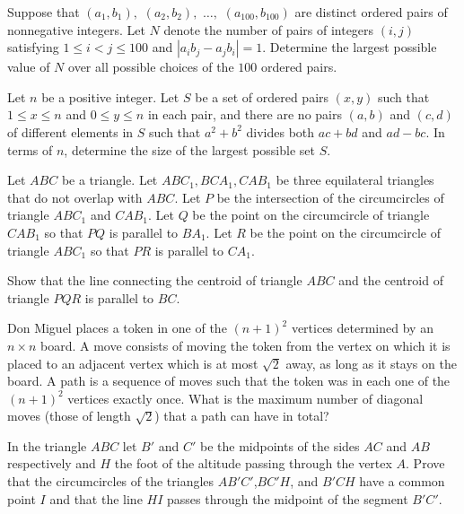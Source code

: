 \documentclass[11pt]{scrartcl}
\begin{document}
\begin{problem}[2556841339462610604]
	Suppose that $(a_1,b_1),$ $(a_2,b_2),$ $\dots,$ $(a_{100},b_{100})$ are distinct ordered pairs of nonnegative integers. Let $N$ denote the number of pairs of integers $(i,j)$ satisfying $1\leq i<j\leq 100$ and $|a_ib_j-a_jb_i|=1$. Determine the largest possible value of $N$ over all possible choices of the $100$ ordered pairs.
\end{problem}
\begin{problem}[172839066140251]
Let $n$ be a positive integer. Let $S$ be a set of ordered pairs $(x, y)$ such that $1\leq x \leq n$ and $0 \leq y \leq n$ in each pair, and there are no pairs $(a, b)$ and $(c, d)$ of different elements in $S$ such that $a^2+b^2$ divides both
$ac+bd$ and $ad - bc$. In terms of $n$, determine the size of the largest possible set $S$.
\end{problem}
\begin{problem}[748616641641895]
Let $ABC$ be a triangle. Let $ABC_1, BCA_1, CAB_1$ be three equilateral triangles that do not overlap with $ABC$.
Let $P$ be the intersection of the circumcircles of triangle $ABC_1$ and $CAB_1$.
Let $Q$ be the point on the circumcircle of triangle $CAB_1$ so that $PQ$ is parallel to $BA_1$. Let $R$ be the point on the circumcircle of triangle $ABC_1$ so that $PR$ is parallel to $CA_1$.

Show that the line connecting the centroid of triangle $ABC$ and the centroid of triangle $PQR$ is parallel to $BC$.
\end{problem}
\begin{problem}[6751071460392744865]
	Don Miguel places a token in one of the $(n+1)^2$ vertices determined by an $n \times n$ board. A move consists of moving the token from the vertex on which it is placed to an adjacent vertex which is at most $\sqrt2$ away, as long as it stays on the board. A path is a sequence of moves such that the token was in each one of the $(n+1)^2$ vertices exactly once. What is the maximum number of diagonal moves (those of length $\sqrt2$) that a path can have in total?
\end{problem}
\begin{problem}[7243491713649826569]
In the triangle $ABC$ let $B'$ and $C'$ be the midpoints of the sides $AC$ and $AB$ respectively and $H$ the foot of the altitude passing through the vertex $A$. Prove that the circumcircles of the triangles $AB'C'$,$BC'H$, and $B'CH$ have a common point $I$ and that the line $HI$ passes through the midpoint of the segment $B'C'.$
\end{problem}
\end{document}
